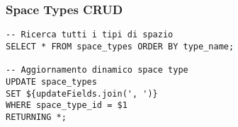 \subsubsection{Space Types CRUD}
\begin{lstlisting}[caption=Query Space Types]
-- Ricerca tutti i tipi di spazio
SELECT * FROM space_types ORDER BY type_name;

-- Aggiornamento dinamico space type
UPDATE space_types 
SET ${updateFields.join(', ')} 
WHERE space_type_id = $1 
RETURNING *;
\end{lstlisting}